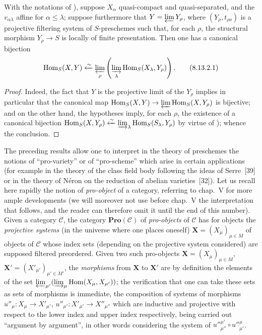 \begin{corollary}[8.13.2]
\label{IV.8.13.2}
With the notations of ), suppose $X_\alpha$ quasi-compact and quasi-separated, and the $v_{\alpha\lambda}$ affine for $\alpha\leqslant\lambda$; suppose furthermore that $Y=\varprojlim Y_\rho$, where $(Y_\rho,t_{\rho o})$ is a projective filtering system of $S$-preschemes such that, for each $\rho$, the structural morphism $Y_\rho\to S$ is locally of finite presentation.
Then one has a canonical bijection
\begin{equation}
\label{IV.8.13.2.1}
\operatorname{Hom}_S(X,Y)\xleftarrow{\sim}\varprojlim_\rho\left(\varinjlim_\lambda\operatorname{Hom}_S(X_\lambda,Y_\rho)\right). \tag{8.13.2.1}
\end{equation}
\end{corollary}

\begin{proof}
Indeed, the fact that $Y$ is the projective limit of the $Y_\rho$ implies in particular that the canonical map $\operatorname{Hom}_S(X,Y)\to\varprojlim\operatorname{Hom}_S(X,Y_\rho)$ is bijective; and on the other hand, the hypotheses imply, for each $\rho$, the existence of a canonical bijection $\operatorname{Hom}_S(X,Y_\rho)\xleftarrow{\sim}\varinjlim_\lambda\operatorname{Hom}_S(S_\lambda,Y_\rho)$ by virtue of ); whence the conclusion.
\end{proof}

\begin{env}[8.13.3]
\label{IV.8.13.3}
The preceding results allow one to interpret in the theory of preschemes the notions of ``pro-variety'' or of ``pro-scheme'' which arise in certain applications (for example in the theory of the class field body following the ideas of Serre~[39] or in the theory of N\'eron on the reduction of
abelian varieties~[32]).
Let us recall here rapidly the notion of \emph{pro-object} of a category, referring to chap.~V for more ample developments (we will moreover not use before chap.~V the interpretation that follows, and the reader can therefore omit it until the end of this number).
Given a category $\mathcal{C}$, the category $\mathbf{Pro}(\mathcal{C})$ of \emph{pro-objects} of $\mathcal{C}$ has for objects the \emph{projective systems} (in the universe where one places oneself) $\mathbf{X}=(X_\mu)_{\mu\in M}$ of objects of $\mathcal{C}$ whose index sets (depending on the projective system considered) are supposed filtered preordered.
Given two such pro-objects $\mathbf{X}=(X_\mu)_{\mu\in M}$, $\mathbf{X}'=(X'_{\mu'})_{\mu'\in M'}$, the \emph{morphisms} from $\mathbf{X}$ to $\mathbf{X}'$ are by definition the elements of the set $\varprojlim_{\mu'}(\varinjlim_\mu\operatorname{Hom}(X_\mu,X_{\mu'}))$; the verification that one can take these sets as sets of morphisms is immediate, the composition of systems of morphisms $u''_\mu:X_\mu\to X'_{\mu'}$, $u''_{\mu'}:X'_{\mu'}\to X''_{\mu''}$ which are inductive and projective with respect to the lower index and upper index respectively, being carried out ``argument by argument'', in other words considering the system of $u''^{\mu'}_{\mu''}\circ u''^{\mu}_{\mu'}$.
\end{env}

